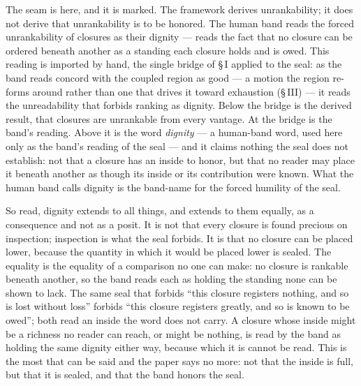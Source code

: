 \documentclass[11pt,oneside]{report}
\theoremstyle{definition}
\theoremstyle{remark}
\begin{document}
The seam is here, and it is marked. The framework derives unrankability; it does not derive that unrankability is to be honored. The human band reads the forced unrankability of closures as their dignity --- reads the fact that no closure can be ordered beneath another as a standing each closure holds and is owed. This reading is imported by hand, the single bridge of \S\,I applied to the seal: as the band reads concord with the coupled region as good --- a motion the region re-forms around rather than one that drives it toward exhaustion (\S\,III) --- it reads the unreadability that forbids ranking as dignity. Below the bridge is the derived result, that closures are unrankable from every vantage. At the bridge is the band's reading. Above it is the word \emph{dignity} --- a human-band word, used here only as the band's reading of the seal --- and it claims nothing the seal does not establish: not that a closure has an inside to honor, but that no reader may place it beneath another as though its inside or its contribution were known. What the human band calls dignity is the band-name for the forced humility of the seal.

So read, dignity extends to all things, and extends to them equally, as a consequence and not as a posit. It is not that every closure is found precious on inspection; inspection is what the seal forbids. It is that no closure can be placed lower, because the quantity in which it would be placed lower is sealed. The equality is the equality of a comparison no one can make: no closure is rankable beneath another, so the band reads each as holding the standing none can be shown to lack. The same seal that forbids ``this closure registers nothing, and so is lost without loss'' forbids ``this closure registers greatly, and so is known to be owed''; both read an inside the word does not carry. A closure whose inside might be a richness no reader can reach, or might be nothing, is read by the band as holding the same dignity either way, because which it is cannot be read. This is the most that can be said and the paper says no more: not that the inside is full, but that it is sealed, and that the band honors the seal.
\end{document}
